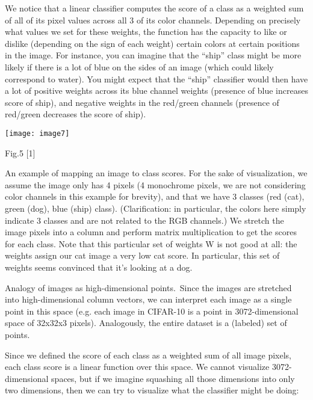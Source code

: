 \documentclass{article} %
\begin{document}
\noindent                   We notice that a linear classifier computes the score of a class as a weighted sum of all of its pixel values across all 3 of its color channels. Depending on precisely what values we set for these weights, the function has the capacity to like or dislike (depending on the sign of each weight) certain colors at certain positions in the image. For instance, you can imagine that the ``ship'' class might be more likely if there is a lot of blue on the sides of an image (which could likely correspond to water). You might expect that the ``ship'' classifier would then have a lot of positive weights across its blue channel weights (presence of blue increases score of ship), and negative weights in the red/green channels (presence of red/green decreases the score of ship).

\noindent 

\noindent \texttt{[image: image7]}

\noindent Fig.5  [1]

\noindent 

\noindent                         An example of mapping an image to class scores. For the sake of visualization, we assume the image only has 4 pixels (4 monochrome pixels, we are not considering color channels in this example for brevity), and that we have 3 classes (red (cat), green (dog), blue (ship) class). (Clarification: in particular, the colors here simply indicate 3 classes and are not related to the RGB channels.) We stretch the image pixels into a column and perform matrix multiplication to get the scores for each class. Note that this particular set of weights W is not good at all: the weights assign our cat image a very low cat score. In particular, this set of weights seems convinced that it's looking at a dog.

\noindent  Analogy of images as high-dimensional points.~Since the images are stretched into high-dimensional column vectors, we can interpret each image as a single point in this space (e.g. each image in CIFAR-10 is a point in 3072-dimensional space of 32x32x3 pixels). Analogously, the entire dataset is a (labeled) set of points.

\noindent                      Since we defined the score of each class as a weighted sum of all image pixels, each class score is a linear function over this space. We cannot visualize 3072-dimensional spaces, but if we imagine squashing all those dimensions into only two dimensions, then we can try to visualize what the classifier might be doing:
\end{document}

